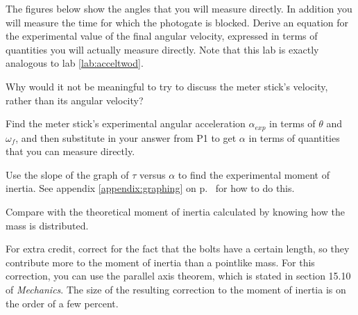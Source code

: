 \prelabquestion  The figures below show the angles that you will measure
directly. In addition you will measure the time for which the photogate
is blocked. Derive an equation for the experimental value of the
final angular velocity, expressed in terms of quantities you
will actually measure directly. Note that this
lab is exactly analogous to lab \ref{lab:acceltwod}.


\prelabquestion  Why would it not be meaningful to try to discuss the
meter stick's velocity, rather than its angular velocity?

\prelabquestion Find the meter stick's experimental angular acceleration
$\alpha_{exp}$ in terms of $\theta$ and $\omega_f$, and then substitute
in your answer from P1 to get $\alpha$ in terms of quantities that
you can measure directly.

\analysis

Use the slope of the graph of $\tau$ versus $\alpha$ to find the
experimental moment of inertia. See appendix \ref{appendix:graphing}
on p.~\pageref{appendix:graphing} for how to do this.

Compare with the theoretical
moment of inertia calculated by knowing how the mass is distributed.

For extra credit,
correct for the fact that the bolts have a certain length,
so they contribute more to the moment of inertia than a pointlike mass.
For this correction, you can use the parallel axis theorem, which is
stated in section 15.10 of \emph{Mechanics}. The size of
the resulting correction to the moment of inertia is on the order of a few
percent.
